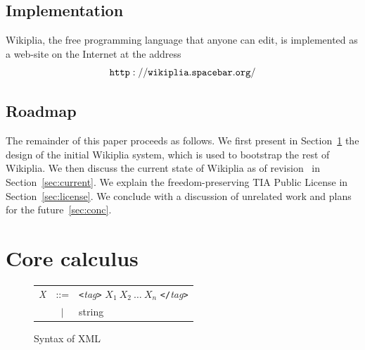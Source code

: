 \documentclass[twocolumn]{article}
\begin{document}
\subsection{Implementation}

Wikiplia, the free programming language that anyone can edit, is
implemented as a web-site on the Internet at the address
$${\tt http://wikiplia.spacebar.org/}$$

\subsection{Roadmap}

The remainder of this paper proceeds as follows. We first present in
Section~\ref{sec:calculus} the design of the initial Wikiplia system,
which is used to bootstrap the rest of Wikiplia. We then discuss the
current state of Wikiplia as of revision \currentrevision\ in
Section~\ref{sec:current}. We explain the freedom-preserving TIA
Public License in Section~\ref{sec:license}. We conclude with a
discussion of unrelated work and plans for the future~\ref{sec:conc}.

\section{Core calculus} \label{sec:calculus}

\begin{figure}[ht]

\begin{center}
\begin{tabular}{rcl}
 {\em X} & ::= & {\tt<}{\em tag}{\tt >} $X_1\ X_2\ \ldots\ X_n$ {\tt</}{\em tag}{\tt >} \\
         & $|$ & string
\end{tabular}
\end{center}
\caption{Syntax of XML} \label{fig:xml}
\end{figure}
\end{document}
